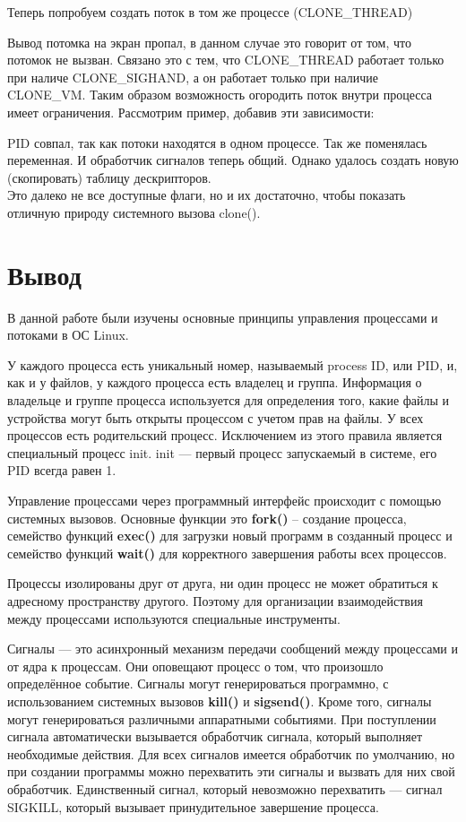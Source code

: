 \documentclass[a4paper]{article}
\begin{document}
	Теперь попробуем создать поток в том же процессе (CLONE\_THREAD)
	
	Вывод потомка на экран пропал, в данном случае это говорит от том, что потомок не вызван. Связано это с тем, что CLONE\_THREAD работает только при наличе CLONE\_SIGHAND, а он работает только при наличие CLONE\_VM. Таким образом возможность огородить поток внутри процесса имеет ограничения. Рассмотрим пример, добавив эти зависимости:
	
	PID совпал, так как потоки находятся в одном процессе. Так же поменялась переменная. И обработчик сигналов теперь общий. Однако удалось создать новую (скопировать) таблицу дескрипторов.\\

	Это далеко не все доступные флаги, но и их достаточно, чтобы показать отличную природу системного вызова clone().
\section{Вывод}
	В данной работе были изучены основные принципы управления процессами и потоками в ОС Linux. 
	
	У каждого процесса есть уникальный номер, называемый process ID, или PID, и, как и у файлов, у каждого процесса есть владелец и группа. Информация о владельце и группе процесса используется для определения того, какие файлы и устройства могут быть открыты процессом с учетом прав на файлы. У всех процессов есть родительский процесс. Исключением из этого правила является специальный процесс init. init --- первый процесс запускаемый в системе, его PID всегда равен 1.
	
	Управление процессами через программный интерфейс происходит с помощью системных вызовов. Основные функции это \textbf{fork()} -- создание процесса, семейство функций \textbf{exec()} для загрузки новый программ в созданный процесс и семейство функций \textbf{wait()} для корректного завершения работы всех процессов.
	
	Процессы изолированы друг от друга, ни один процесс не может обратиться к адресному пространству другого. Поэтому для организации взаимодействия между процессами используются специальные инструменты.
	
	Сигналы — это асинхронный механизм передачи сообщений между процессами и от ядра к процессам. Они оповещают процесс о том, что произошло определённое событие. Сигналы могут генерироваться программно, с использованием системных вызовов \textbf{kill()} и \textbf{sigsend()}. Кроме того, сигналы могут генерироваться различными аппаратными событиями.  При поступлении сигнала автоматически вызывается обработчик сигнала, который выполняет необходимые действия. Для всех сигналов имеется обработчик по умолчанию, но при создании программы можно перехватить эти сигналы и вызвать для них свой обработчик. Единственный сигнал, который невозможно перехватить --- сигнал SIGKILL, который вызывает принудительное завершение процесса.
	
\end{document}
